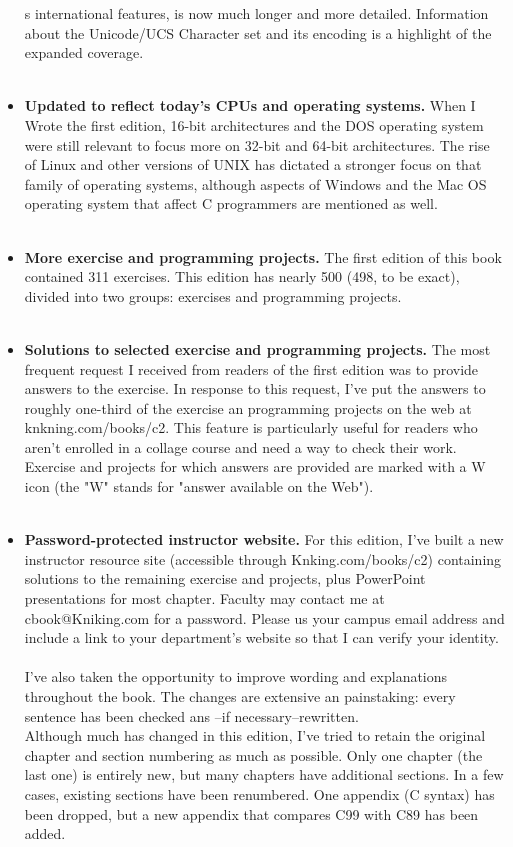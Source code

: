 \documentclass{article}
\begin{document}
\begin{itemize}
     s international features, is now much longer and more detailed. Information about the Unicode/UCS Character set and its encoding is a highlight of  the expanded coverage.
     \\
     \\
     \item\textbf{Updated to reflect today's CPUs and operating systems.} When I Wrote the first edition, 16-bit architectures and the DOS operating system were still relevant to focus more on 32-bit and 64-bit architectures. The rise of Linux and other versions of UNIX has dictated a stronger focus on that family of operating systems, although aspects of Windows and the Mac OS operating system that affect C programmers are mentioned as well.
     \\
     \\
     \item\textbf{More exercise and programming projects.} The first edition of this book contained 311 exercises. This edition has nearly 500 (498, to be exact), divided into two groups: exercises and programming projects.
     \\
     \\
      \item\textbf{Solutions to selected exercise and programming projects.} The most frequent request I received from readers of the first edition was to provide answers to the exercise. In response to this request, I've put the answers to roughly one-third of the exercise an programming projects on the web at knkning.com/books/c2. This feature is particularly useful for readers who aren't enrolled in a collage course and need a way to check their work. Exercise and projects for which answers are provided are marked with a W icon (the "W" stands for "answer available on the Web").
      \\
      \\
       \item\textbf{Password-protected instructor website.} For this edition, I've built a new instructor resource site (accessible through Knking.com/books/c2) containing solutions to the remaining exercise and projects, plus PowerPoint presentations for most chapter. Faculty may contact me at cbook@Kniking.com for a password. Please us your campus email address and include a link to your department's website so that I can verify your identity.
       \\
       \\
       I've also taken the opportunity to improve wording and explanations throughout the book. The changes are extensive an painstaking: every sentence has been checked ans --if necessary--rewritten.\\
        Although much has changed in this edition, I've tried to retain the original chapter and section numbering as much as possible. Only one chapter (the last one) is entirely new, but many chapters have additional sections. In a few cases, existing sections have been renumbered. One appendix (C syntax) has been dropped, but a new appendix that compares C99
        with C89 has been added.
        \\
        \\
 \end{itemize}
 
\end{document}
